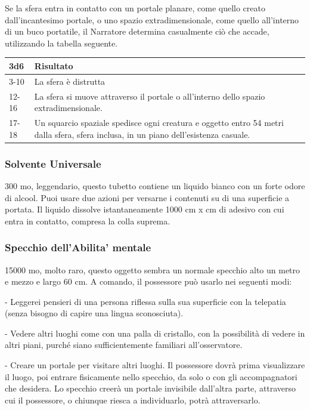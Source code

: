 \begin{multicols}{2}
	Se la sfera entra in contatto con un portale planare, come quello creato dall'incantesimo portale, o uno spazio extradimensionale, come quello all'interno di un buco portatile, il Narratore determina casualmente ciò che accade, utilizzando la tabella seguente.

	\medskip

	\begin{tabularx}{0.45\textwidth}{lX}
		\textbf{3d6}& \textbf{Risultato}\\
		\hline
		3-10 &La sfera è distrutta\\
		12-16& La sfera si muove attraverso il portale o all'interno dello spazio extradimensionale.\\
		17-18 &Un squarcio spaziale spedisce ogni creatura e oggetto entro 54 metri dalla sfera, sfera inclusa, in un piano dell'esistenza casuale.\\
	\end{tabularx}

	\medskip

	\subsubsection*{Solvente Universale}
	300 mo, leggendario, questo tubetto contiene un liquido bianco con un forte odore di alcool. Puoi usare due azioni per versarne i contenuti su di una superficie a portata. Il liquido dissolve istantaneamente 1000 cm x cm di adesivo con cui entra in contatto, compresa la colla suprema.

	\subsubsection*{Specchio dell’Abilita' mentale}
	15000 mo, molto raro, questo oggetto sembra un normale specchio alto un metro e mezzo e largo 60 cm. A comando, il possessore può usarlo nei seguenti modi:

	- Leggerei pensieri di una persona riflessa sulla sua superficie con la telepatia (senza bisogno di capire una lingua sconosciuta).

	- Vedere altri luoghi come con una palla di cristallo, con la possibilità di vedere in altri piani, purché siano sufficientemente familiari all’osservatore.

	- Creare un portale per visitare altri luoghi. Il possessore dovrà prima visualizzare il luogo, poi entrare fisicamente nello specchio, da solo o con gli accompagnatori che desidera. Lo specchio creerà un portale invisibile dall’altra parte, attraverso cui il possessore, o chiunque riesca a individuarlo, potrà attraversarlo.


\end{multicols}
